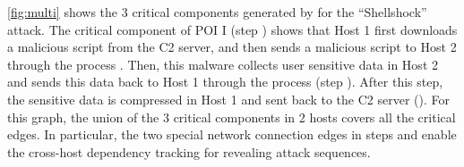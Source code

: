 
\cref{fig:multi} shows the 3 critical components generated by \tool for the ``Shellshock'' attack. 
The critical component of POI I (step ) shows that Host 1 first downloads a malicious script from the C2 server, and then sends a malicious script  to Host 2 through the process . 
Then, this malware collects user sensitive data in Host 2 and sends this data back to Host 1 through the process  (step ). 
After this step, the sensitive data is compressed in Host 1 and sent back to the C2 server (). 
For this graph, the union of the 3 critical components in 2 hosts covers all the critical edges.
In particular, the two special network connection edges in steps  and  enable the cross-host dependency tracking for revealing attack sequences.



  